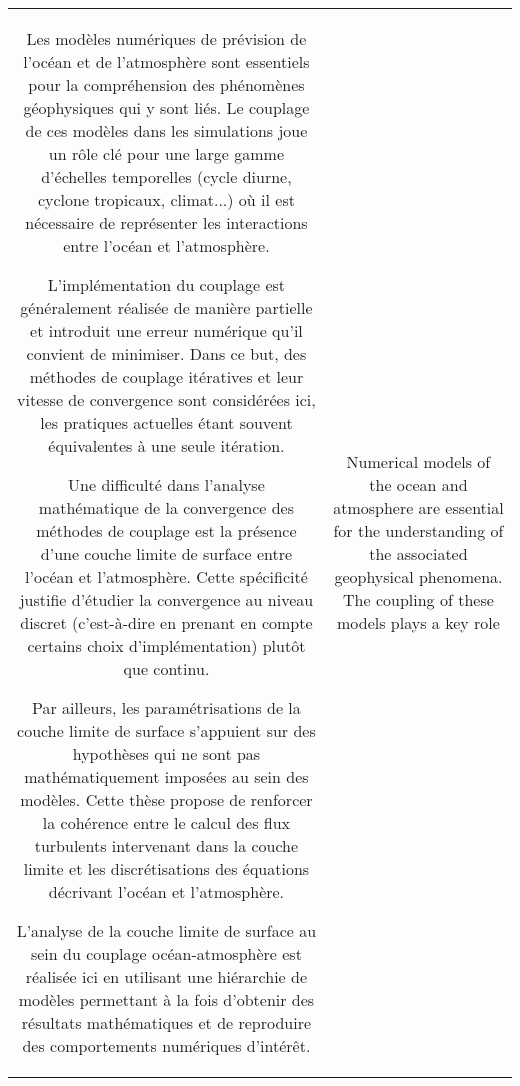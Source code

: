 \clearpage
{}
{}
\thispagestyle{empty}
\begin{tabular}{c|c}
{\begin{minipage}{18em}
Les modèles numériques de prévision de l'océan et de l'atmosphère
sont essentiels pour la compréhension des phénomènes géophysiques
qui y sont liés.
Le couplage de ces modèles dans les simulations
joue un rôle clé pour une large gamme d'échelles temporelles
(cycle diurne, cyclone tropicaux, climat...)
où il est nécessaire de représenter les interactions entre l'océan et
l'atmosphère.
\par
	\vspace{0.2cm}
L'implémentation du couplage est généralement réalisée de manière
partielle et introduit une erreur numérique qu'il convient de
minimiser. Dans ce but, des méthodes de couplage itératives et
leur vitesse de convergence sont considérées ici, les pratiques
actuelles étant souvent équivalentes à une seule itération.
\par
	\vspace{0.2cm}
Une difficulté dans l'analyse mathématique de la convergence
des méthodes de couplage est la présence d'une couche limite
de surface entre l'océan et l'atmosphère.
Cette spécificité justifie d'étudier la convergence au niveau
discret (c'est-à-dire en prenant en compte certains choix
d'implémentation) plutôt que continu.
\par
	\vspace{0.2cm}
Par ailleurs, les paramétrisations de la couche limite
de surface s'appuient sur des hypothèses
qui ne sont pas mathématiquement imposées au sein des modèles.
Cette thèse propose de renforcer la cohérence entre
le calcul des flux turbulents intervenant dans la couche limite
et les discrétisations des équations décrivant l'océan
et l'atmosphère.
\par
	\vspace{0.2cm}
L'analyse de la couche limite de surface au sein du couplage
océan-atmosphère est réalisée ici en utilisant une hiérarchie
de modèles permettant à la fois d'obtenir des résultats
mathématiques et de reproduire des comportements numériques d'intérêt.
\end{minipage}}
&
{\begin{minipage}{18em}
Numerical models of the ocean and atmosphere
are essential for the understanding of the
associated geophysical phenomena.
The coupling of these models plays a key role

\end{minipage}}
\end{tabular}

